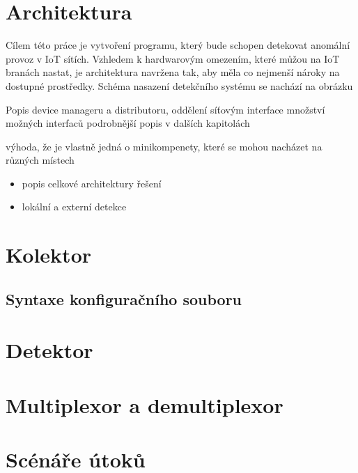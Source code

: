  \section{Architektura}
 Cílem této práce je vytvoření programu, který bude schopen detekovat anomální provoz v IoT sítích. 
 Vzhledem k hardwarovým omezením, které můžou na IoT branách nastat, je architektura navržena tak, aby
 měla co nejmenší nároky na dostupné prostředky. Schéma nasazení detekčního systému se nachází
 na obrázku
 
 Popis device manageru a distributoru, 
 oddělení síťovým interface
 množství možných interfaců
 podrobnější popis v dalších kapitolách
 
 výhoda, že je vlastně jedná o minikompenety, které se mohou nacházet na různých místech
 
 
    \begin{itemize}
      \item popis celkové architektury řešení
      \item lokální a externí detekce
    \end{itemize}

 \section{Kolektor}
 \subsection{Syntaxe konfiguračního souboru}
    
 \section{Detektor}
 \section{Multiplexor a demultiplexor}
 
  \section{Scénáře útoků}
